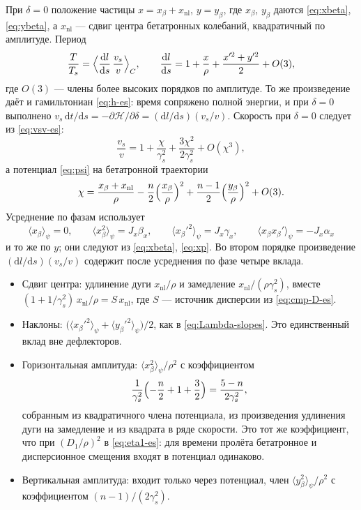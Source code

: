 При $\delta=0$ положение частицы $x=x_\beta+x_{\mathrm{nl}}$, $y=y_\beta$, где $x_\beta$, $y_\beta$ даются \eqref{eq:xbeta}, \eqref{eq:ybeta}, а $x_{\mathrm{nl}}$ --- сдвиг центра бетатронных колебаний, квадратичный по амплитуде. Период
\begin{equation}
\label{eq:T-ratio-es}
\frac{T}{T_s}
=\Bigl\langle\frac{\mathrm{d}l}{\mathrm{d}s}\,\frac{v_s}{v}\Bigr\rangle_C,
\qquad
\frac{\mathrm{d}l}{\mathrm{d}s}
=1+\frac{x}{\rho}+\frac{x'^2+y'^2}{2}+O(3),
\end{equation}
где $O(3)$ --- члены более высоких порядков по амплитуде. То же произведение даёт и гамильтониан \eqref{eq:h-es}: время сопряжено полной энергии, и при $\delta=0$ выполнено $v_s\,\mathrm{d}t/\mathrm{d}s=-\partial\mathcal{H}/\partial\delta=(\mathrm{d}l/\mathrm{d}s)(v_s/v)$. Скорость при $\delta=0$ следует из \eqref{eq:vsv-es}:
\begin{equation}
\label{eq:v-delta0}
\frac{v_s}{v}
=1+\frac{\chi}{\gamma_s^2}+\frac{3\chi^2}{2\gamma_s^2}+O(\chi^3),
\end{equation}
а потенциал \eqref{eq:psi} на бетатронной траектории
\begin{equation}
\label{eq:psi-amp}
\chi
=\frac{x_\beta+x_{\mathrm{nl}}}{\rho}
-\frac{n}{2}\Bigl(\frac{x_\beta}{\rho}\Bigr)^2
+\frac{n-1}{2}\Bigl(\frac{y_\beta}{\rho}\Bigr)^2
+O(3).
\end{equation}
Усреднение по фазам использует
\begin{equation}
\label{eq:avg-twiss-es}
\langle x_\beta\rangle_\psi=0,
\qquad
\langle x_\beta^2\rangle_\psi=J_x\beta_x,
\qquad
\langle x_\beta'^2\rangle_\psi=J_x\gamma_x,
\qquad
\langle x_\beta x_\beta'\rangle_\psi=-J_x\alpha_x
\end{equation}
и то же по $y$; они следуют из \eqref{eq:xbeta}, \eqref{eq:xp}. Во втором порядке произведение $(\mathrm{d}l/\mathrm{d}s)(v_s/v)$ содержит после усреднения по фазе четыре вклада.
\begin{itemize}
\item Сдвиг центра: удлинение дуги $x_{\mathrm{nl}}/\rho$ и замедление $x_{\mathrm{nl}}/(\rho\gamma_s^2)$, вместе $(1+1/\gamma_s^2)\,x_{\mathrm{nl}}/\rho=S\,x_{\mathrm{nl}}$, где $S$ --- источник дисперсии из \eqref{eq:cmp-D-es}.
\item Наклоны: $\bigl(\langle x_\beta'^2\rangle_\psi+\langle y_\beta'^2\rangle_\psi\bigr)/2$, как в \eqref{eq:Lambda-slopes}. Это единственный вклад вне дефлекторов.
\item Горизонтальная амплитуда: $\langle x_\beta^2\rangle_\psi/\rho^2$ с коэффициентом
\begin{equation}
\label{eq:coeff-x2}
\frac{1}{\gamma_s^2}\Bigl(-\frac{n}{2}+1+\frac{3}{2}\Bigr)
=\frac{5-n}{2\gamma_s^2},
\end{equation}
собранным из квадратичного члена потенциала, из произведения удлинения дуги на замедление и из квадрата в ряде скорости. Это тот же коэффициент, что при $(D_1/\rho)^2$ в \eqref{eq:eta1-es}: для времени пролёта бетатронное и дисперсионное смещения входят в потенциал одинаково.
\item Вертикальная амплитуда: входит только через потенциал, член $\langle y_\beta^2\rangle_\psi/\rho^2$ с коэффициентом $(n-1)/(2\gamma_s^2)$.
\end{itemize}
